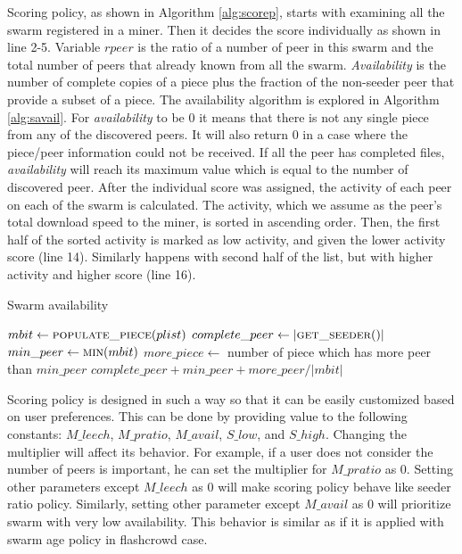 Scoring policy, as shown in Algorithm \ref{alg:scorep}, starts with examining all the swarm registered in a miner. Then it decides the score individually as shown in line 2-5. Variable $rpeer$ is the ratio of a number of peer in this swarm and the total number of peers that already known from all the swarm. \textit{Availability} is the number of complete copies of a piece plus the fraction of the non-seeder peer that provide a subset of a piece. The availability algorithm is explored in Algorithm \ref{alg:savail}. For \textit{availability} to be 0 it means that there is not any single piece from any of the discovered peers. It will also return 0 in a case where the piece/peer information could not be received. If all the peer has completed files, \textit{availability} will reach its maximum value which is equal to the number of discovered peer. After the individual score was assigned, the activity of each peer on each of the swarm is calculated. The activity, which we assume as the peer's total download speed to the miner, is sorted in ascending order. Then, the first half of the sorted activity is marked as low activity, and given the lower activity score (line 14). Similarly happens with second half of the list, but with higher activity and higher score (line 16).

\begin{algorithm}[h]
	\caption{Swarm availability}
	\label{alg:savail}
	\begin{algorithmic}[1]
		\State $mbit \gets \Call{populate\_piece}{plist}$
		\State $complete\_peer \gets |\Call{get\_seeder}{\null}|$ 
		\State $min\_peer \gets \Call{min}{mbit}$
		\State $more\_piece \gets $ number of piece which has more peer than $min\_peer$
		\State \Return $complete\_peer + min\_peer + more\_peer/|mbit|$
	\end{algorithmic}
\end{algorithm}

Scoring policy is designed in such a way so that it can be easily customized based on user preferences. This can be done by providing value to the following constants: $M\_leech$, $M\_pratio$, $M\_avail$, $S\_low$, and $S\_high$. Changing the multiplier will affect its behavior. For example, if a user does not consider the number of peers is important, he can set the multiplier for $M\_pratio$ as 0. Setting other parameters except $M\_leech$ as 0 will make scoring policy behave like seeder ratio policy. Similarly, setting other parameter except $M\_avail$ as 0 will prioritize swarm with very low availability. This behavior is similar as if it is applied with swarm age policy in flashcrowd case.

